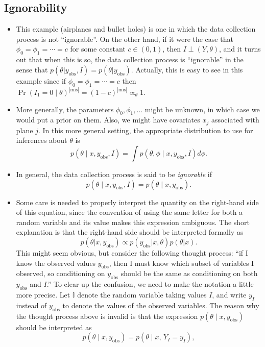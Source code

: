 \documentclass[12pt]{article}
\newcommand{\II}{\mathbb{I}}
\begin{document}
\subsection{Ignorability}
\begin{itemize}
\item This example (airplanes and bullet holes) is one in which the data collection process is not ``ignorable''. On the other hand, if it were the case that $\phi_0 = \phi_1 = \cdots = c$ for some constant $c \in (0,1)$, then 
$I \perp (Y,\theta)$,
and it turns out that when this is so, the data collection process is ``ignorable'' in the sense that $p(\theta | y_\text{obs},I) = p(\theta | y_\text{obs})$. Actually, this is easy to see in this example since if $\phi_0 = \phi_1 = \cdots = c$ then $\Pr(I_1 = 0 \mid \theta)^{|\text{mis} |} = (1 - c)^{|\text{mis} |} \propto_\theta 1$.
\item More generally, the parameters $\phi_0,\phi_1,\ldots$ might be unknown, in which case we would put a prior on them. Also, we might have covariates $x_j$ associated with plane $j$. In this more general setting, the appropriate distribution to use for inferences about $\theta$ is
$$ p(\theta \mid x,y_\text{obs},I) = \int p(\theta,\phi \mid x,y_\text{obs},I) d \phi. $$
\item In general, the data collection process is said to be \textit{ignorable} if
$$ p(\theta \mid x,y_\text{obs},I) = p(\theta \mid x,y_\text{obs}). $$
\item Some care is needed to properly interpret the quantity on the right-hand side of this equation, since the convention of using the same letter for both a random variable and its value makes this expression ambiguous. The short explanation is that the right-hand side should be interpreted formally as
$$ p(\theta | x,y_\text{obs}) \propto p(y_\text{obs} | x,\theta) p(\theta | x). $$
This might seem obvious, but consider the following thought process: ``if I know the observed values $y_\text{obs}$, then I must know which subset of variables I observed, so conditioning on $y_\text{obs}$ should be the same as conditioning on both $y_\text{obs}$ and $I$.'' To clear up the confusion, we need to make the notation a little more precise. Let $\II$ denote the random variable taking values $I$, and write $y_I$ instead of $y_\text{obs}$ to denote the values of the observed variables. The reason why the thought process above is invalid is that the expression $p(\theta \mid x,y_\text{obs})$ should be interpreted as
$$ p(\theta \mid x,y_\text{obs}) = p(\theta \mid x,\, Y_I=y_I), $$

\end{itemize}
\end{document}
